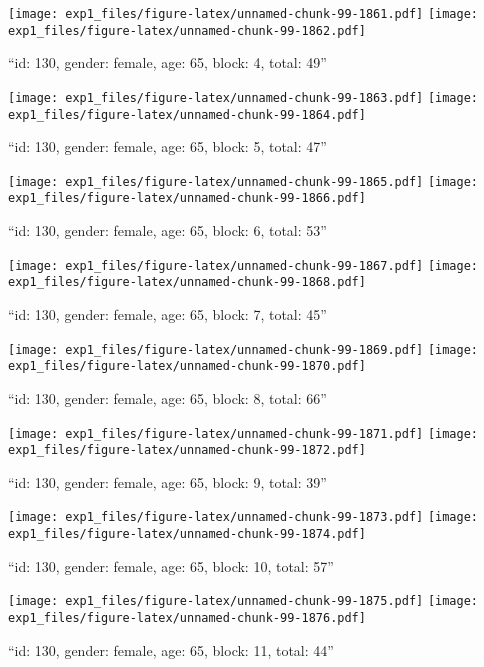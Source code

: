 \documentclass[,]{article}
\begin{document}
\texttt{[image: exp1\_files/figure-latex/unnamed-chunk-99-1861.pdf]}
\texttt{[image: exp1\_files/figure-latex/unnamed-chunk-99-1862.pdf]}

\newpage
[1] 

``id: 130, gender: female, age: 65, block: 4, total: 49''

\texttt{[image: exp1\_files/figure-latex/unnamed-chunk-99-1863.pdf]}
\texttt{[image: exp1\_files/figure-latex/unnamed-chunk-99-1864.pdf]}

\newpage
[1] 

``id: 130, gender: female, age: 65, block: 5, total: 47''

\texttt{[image: exp1\_files/figure-latex/unnamed-chunk-99-1865.pdf]}
\texttt{[image: exp1\_files/figure-latex/unnamed-chunk-99-1866.pdf]}

\newpage
[1] 

``id: 130, gender: female, age: 65, block: 6, total: 53''

\texttt{[image: exp1\_files/figure-latex/unnamed-chunk-99-1867.pdf]}
\texttt{[image: exp1\_files/figure-latex/unnamed-chunk-99-1868.pdf]}

\newpage
[1] 

``id: 130, gender: female, age: 65, block: 7, total: 45''

\texttt{[image: exp1\_files/figure-latex/unnamed-chunk-99-1869.pdf]}
\texttt{[image: exp1\_files/figure-latex/unnamed-chunk-99-1870.pdf]}

\newpage
[1] 

``id: 130, gender: female, age: 65, block: 8, total: 66''

\texttt{[image: exp1\_files/figure-latex/unnamed-chunk-99-1871.pdf]}
\texttt{[image: exp1\_files/figure-latex/unnamed-chunk-99-1872.pdf]}

\newpage
[1] 

``id: 130, gender: female, age: 65, block: 9, total: 39''

\texttt{[image: exp1\_files/figure-latex/unnamed-chunk-99-1873.pdf]}
\texttt{[image: exp1\_files/figure-latex/unnamed-chunk-99-1874.pdf]}

\newpage
[1] 

``id: 130, gender: female, age: 65, block: 10, total: 57''

\texttt{[image: exp1\_files/figure-latex/unnamed-chunk-99-1875.pdf]}
\texttt{[image: exp1\_files/figure-latex/unnamed-chunk-99-1876.pdf]}

\newpage
[1] 

``id: 130, gender: female, age: 65, block: 11, total: 44''
\end{document}
